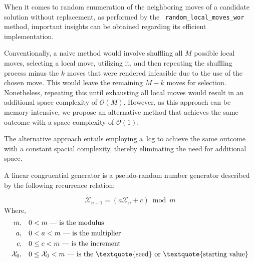 \begin{center}

\end{center}

When it comes to random enumeration of the neighboring moves of a candidate solution
without replacement, as performed by the ~\texttt{random\_local\_moves\_wor} method,
important insights can be obtained regarding its efficient implementation.

Conventionally, a naive method would involve shuffling all $M$ possible local
moves, selecting a local move, utilizing it, and then repeating the shuffling
process minus the $k$ moves that were rendered infeasible due to the use of the
chosen move. This would leave the remaining $M - k$ moves for selection.
Nonetheless, repeating this until exhausting all local moves would result in an
additional space complexity of $\mathcal{O}(M)$. However, as this approach can
be memory-intensive, we propose an alternative method that achieves the same
outcome with a space complexity of $\mathcal{O}(1)$.

The alternative approach entails employing a~\acrfull{lcg} to achieve the same
outcome with a constant spacial complexity, thereby eliminating the need for
additional space.

\begin{definition}
  A linear congruential generator is a pseudo-random number generator
  described by the following recurrence relation:

  \begin{equation}
    \mathcal{X}_{n+1} = (a\mathcal{X}_{n} + c) \bmod m
  \end{equation}
  Where,
  \begin{align*}
    m,               & \quad 0 < m \text{ — is the modulus}                                                             \\
    a,               & \quad 0 < a < m \text{ — is the multiplier}                                                      \\
    c,               & \quad 0 \leq c < m \text{ — is the increment}                                                    \\
    \mathcal{X}_{0}, & \quad 0 \leq \mathcal{X}_{0} < m \text{ — is the \textquote{seed} or \textquote{starting value}}
  \end{align*}
\end{definition}

